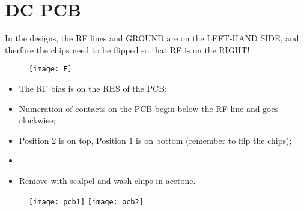 
\section{DC PCB}
\begin{framed}\noindent
  In the designs, the RF lines  and GROUND are on the LEFT-HAND SIDE,
  and therfore  the chips  need to be  flipped so that  RF is  on the
  RIGHT!
\end{framed}
\begin{figure}[h]
  \centering \texttt{[image: F]}
\end{figure}

\begin{itemize}
\item The RF bias is on the RHS of the PCB;
\item Numeration of  contacts on the PCB begin below  the RF line and
  goes clockwise;
\item Position 2 is on top, Position 1 is on bottom (remember to flip
  the chips);
\item {}
\item Remove with scalpel and wash chips in acetone.
\end{itemize}

 \begin{figure}[h]
   \centering%
   \texttt{[image: pcb1]}%
   \texttt{[image: pcb2]}%
 \end{figure}
 \newpage
